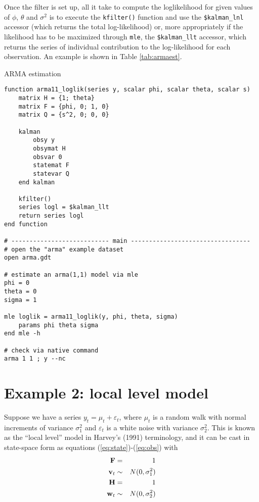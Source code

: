 \documentclass[a4paper]{article}
\newcommand{\obsmat}{\ensuremath\mathbf{H}}
\newcommand{\obsdist}{\ensuremath\mathbf{w}}
\newcommand{\statemat}{\ensuremath\mathbf{F}}
\newcommand{\strdist}{\ensuremath\mathbf{v}}
\begin{document}
Once the filter is set up, all it take to compute the loglikelihood
for given values of $\phi$, $\theta$ and $\sigma^2$ is to execute the
\texttt{kfilter()} function and use the \verb+$kalman_lnl+ accessor
(which returns the total log-likelihood) or, more appropriately if the
likelihood has to be maximized through \texttt{mle}, the
\verb+$kalman_llt+ accessor, which returns the series of individual
contribution to the log-likelihood for each observation. An example
is shown in Table \ref{tab:armaest}.

\begin{table}[htbp]
  \caption{ARMA estimation}
  \label{tab:armaest}

\begin{small}
\begin{verbatim}
function arma11_loglik(series y, scalar phi, scalar theta, scalar s)
    matrix H = {1; theta}
    matrix F = {phi, 0; 1, 0}
    matrix Q = {s^2, 0; 0, 0}

    kalman
        obsy y
        obsymat H
        obsvar 0
        statemat F
        statevar Q
    end kalman

    kfilter()
    series logl = $kalman_llt
    return series logl
end function

# --------------------------- main ---------------------------------
# open the "arma" example dataset
open arma.gdt 

# estimate an arma(1,1) model via mle
phi = 0
theta = 0
sigma = 1

mle loglik = arma11_loglik(y, phi, theta, sigma)
    params phi theta sigma
end mle -h

# check via native command 
arma 1 1 ; y --nc
\end{verbatim}
\end{small}
\end{table}

\section{Example 2: local level model}
\label{sec:example_loclev}

Suppose we have a series $y_t = \mu_t + \varepsilon_t$, where $\mu_t$
is a random walk with normal increments of variance $\sigma^2_1$ and $
\varepsilon_t$ is a white noise with variance $\sigma^2_2$.  This is
known as the ``local level'' model in Harvey's (1991) terminology, and
it can be cast in state-space form as equations
(\ref{eq:state})-(\ref{eq:obs}) with
\begin{eqnarray*}
  \statemat & = & 1 \\
  \strdist_t & \sim & N(0, \sigma^2_1) \\
  \obsmat & = & 1 \\
  \obsdist_t & \sim & N(0, \sigma^2_2)
\end{eqnarray*}
\end{document}
